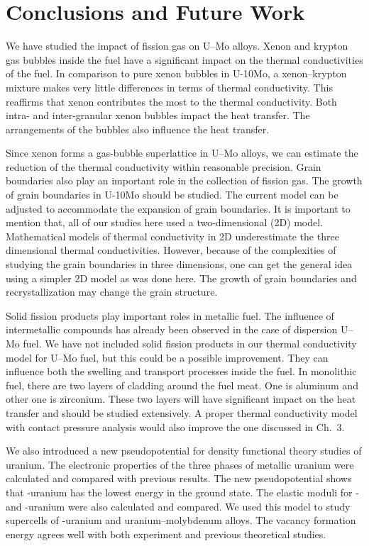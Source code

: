 \chapter{Conclusions and Future Work}
We have studied the impact of fission gas on U--Mo alloys. Xenon and krypton gas bubbles inside the fuel have a significant impact on the thermal conductivities of the fuel. In comparison to pure xenon bubbles in U-10Mo, a xenon--krypton mixture makes very little differences in terms of thermal conductivity. This reaffirms that xenon contributes the most to the thermal conductivity. Both intra- and inter-granular xenon bubbles impact the heat transfer. The arrangements of the bubbles also influence the heat transfer. 


Since xenon forms a gas-bubble superlattice in U--Mo alloys, we can estimate the reduction of the thermal conductivity within reasonable precision. Grain boundaries also play an important role in the collection of fission gas. The growth of grain boundaries in U-10Mo should be studied. The current model can be adjusted to accommodate the expansion of grain boundaries. It is important to mention that, all of our studies here used a two-dimensional (2D) model. Mathematical models of thermal conductivity in 2D underestimate the three dimensional thermal conductivities. However, because of the complexities of studying the grain boundaries in three dimensions, one can get the general idea using a simpler 2D model as was done here. The growth of grain boundaries and recrystallization may change the grain structure.


Solid fission products play important roles in metallic fuel. The influence of intermetallic compounds has already been observed in the case of dispersion U--Mo fuel. We have not included solid fission products in our thermal conductivity model for U--Mo fuel, but this could be a possible improvement. They can influence both the swelling and transport processes inside the fuel. In monolithic fuel, there are two layers of cladding around the fuel meat. One is aluminum and other one is zirconium. These two layers will have significant impact on the heat transfer and should be studied extensively. A proper thermal conductivity model with contact pressure analysis would also improve the one discussed in Ch.~3.

We also introduced a new pseudopotential for density functional theory studies of uranium. The electronic properties of the three phases of metallic uranium were calculated and compared with previous results. The new pseudopotential shows that \textalpha-uranium has the lowest energy in the ground state. The elastic moduli for \textalpha-\@ and \textgamma-uranium were also calculated and compared. We used this model to study supercells of \textgamma-uranium and uranium--molybdenum alloys. The vacancy formation energy agrees well with both experiment and previous theoretical studies. 

